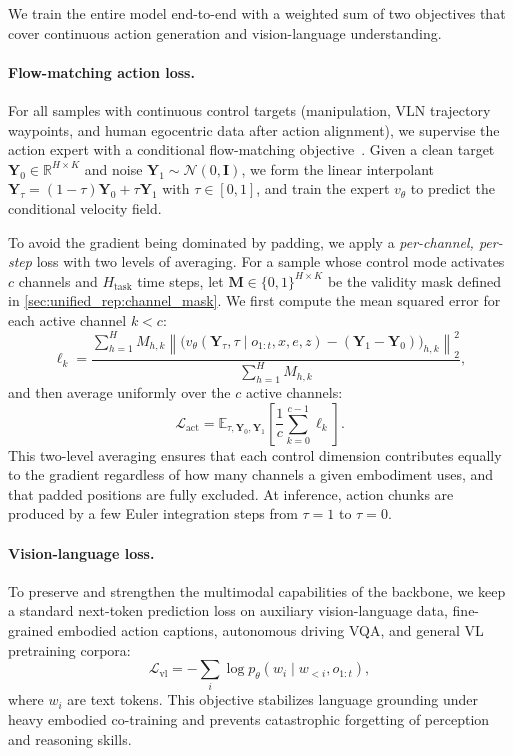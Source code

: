 We train the entire model end-to-end with a weighted sum of two objectives that cover continuous action generation and vision-language understanding.

\paragraph{Flow-matching action loss.}
For all samples with continuous control targets (manipulation, VLN trajectory waypoints, and human egocentric data after action alignment), we supervise the action expert with a conditional flow-matching objective~\citep{lipman2023flow}.
Given a clean target $\mathbf{Y}_0 \in \mathbb{R}^{H \times K}$ and noise $\mathbf{Y}_1 \sim \mathcal{N}(0, \mathbf{I})$, we form the linear interpolant $\mathbf{Y}_\tau = (1-\tau)\mathbf{Y}_0 + \tau \mathbf{Y}_1$ with $\tau \in [0,1]$, and train the expert $v_\theta$ to predict the conditional velocity field.

To avoid the gradient being dominated by padding, we apply a \emph{per-channel, per-step} loss with two levels of averaging.
For a sample whose control mode activates $c$ channels and $H_{\text{task}}$ time steps, let $\mathbf{M} \in \{0,1\}^{H \times K}$ be the validity mask defined in \cref{sec:unified_rep:channel_mask}.
We first compute the mean squared error for each active channel $k < c$:
\begin{equation}
\ell_k = \frac{
    \displaystyle\sum_{h=1}^{H} M_{h,k}
    \left\| \bigl(v_\theta(\mathbf{Y}_\tau, \tau \mid o_{1:t}, x, e, z) - (\mathbf{Y}_1 - \mathbf{Y}_0)\bigr)_{h,k} \right\|_2^2
}{
    \displaystyle\sum_{h=1}^{H} M_{h,k}
},
\end{equation}
and then average uniformly over the $c$ active channels:
\begin{equation}
\mathcal{L}_{\text{act}} = \mathbb{E}_{\tau,\mathbf{Y}_0,\mathbf{Y}_1} \left[ \frac{1}{c} \sum_{k=0}^{c-1} \ell_k \right].
\end{equation}
This two-level averaging ensures that each control dimension contributes equally to the gradient regardless of how many channels a given embodiment uses, and that padded positions are fully excluded.
At inference, action chunks are produced by a few Euler integration steps from $\tau=1$ to $\tau=0$.

\paragraph{Vision-language loss.}
To preserve and strengthen the multimodal capabilities of the backbone, we keep a standard next-token prediction loss on auxiliary vision-language data, fine-grained embodied action captions, autonomous driving VQA, and general VL pretraining corpora:
\begin{equation}
\mathcal{L}_{\text{vl}} = - \sum_{i} \log p_\theta(w_i \mid w_{<i}, o_{1:t}),
\end{equation}
where $w_i$ are text tokens. This objective stabilizes language grounding under heavy embodied co-training and prevents catastrophic forgetting of perception and reasoning skills.


